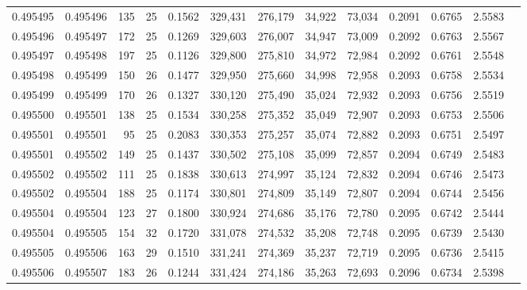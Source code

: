 \begin{tabular}{rrrrrrrrrrrrr}
0.495495 & 0.495496 & 135 &  25 &                                     0.1562 & 329,431 & 276,179 &  34,922 &  73,034 & 0.2091 & 0.6765 & 2.5583 \\
0.495496 & 0.495497 & 172 &  25 &                                     0.1269 & 329,603 & 276,007 &  34,947 &  73,009 & 0.2092 & 0.6763 & 2.5567 \\
0.495497 & 0.495498 & 197 &  25 &                                     0.1126 & 329,800 & 275,810 &  34,972 &  72,984 & 0.2092 & 0.6761 & 2.5548 \\
0.495498 & 0.495499 & 150 &  26 &                                     0.1477 & 329,950 & 275,660 &  34,998 &  72,958 & 0.2093 & 0.6758 & 2.5534 \\
0.495499 & 0.495499 & 170 &  26 &                                     0.1327 & 330,120 & 275,490 &  35,024 &  72,932 & 0.2093 & 0.6756 & 2.5519 \\
0.495500 & 0.495501 & 138 &  25 &                                     0.1534 & 330,258 & 275,352 &  35,049 &  72,907 & 0.2093 & 0.6753 & 2.5506 \\
0.495501 & 0.495501 &  95 &  25 &                                     0.2083 & 330,353 & 275,257 &  35,074 &  72,882 & 0.2093 & 0.6751 & 2.5497 \\
0.495501 & 0.495502 & 149 &  25 &                                     0.1437 & 330,502 & 275,108 &  35,099 &  72,857 & 0.2094 & 0.6749 & 2.5483 \\
0.495502 & 0.495502 & 111 &  25 &                                     0.1838 & 330,613 & 274,997 &  35,124 &  72,832 & 0.2094 & 0.6746 & 2.5473 \\
0.495502 & 0.495504 & 188 &  25 &                                     0.1174 & 330,801 & 274,809 &  35,149 &  72,807 & 0.2094 & 0.6744 & 2.5456 \\
0.495504 & 0.495504 & 123 &  27 &                                     0.1800 & 330,924 & 274,686 &  35,176 &  72,780 & 0.2095 & 0.6742 & 2.5444 \\
0.495504 & 0.495505 & 154 &  32 &                                     0.1720 & 331,078 & 274,532 &  35,208 &  72,748 & 0.2095 & 0.6739 & 2.5430 \\
0.495505 & 0.495506 & 163 &  29 &                                     0.1510 & 331,241 & 274,369 &  35,237 &  72,719 & 0.2095 & 0.6736 & 2.5415 \\
0.495506 & 0.495507 & 183 &  26 &                                     0.1244 & 331,424 & 274,186 &  35,263 &  72,693 & 0.2096 & 0.6734 & 2.5398 \\

\end{tabular}
